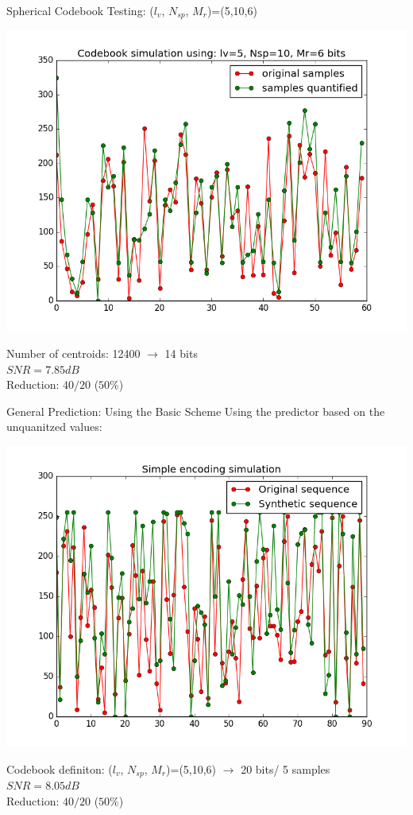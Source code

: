 \documentclass[10pt]{beamer}
\begin{document}
  \begin{frame}{Spherical Codebook Testing: ($l_v$, $N_{sp}$, $M_r$)=(5,10,6)}
    \begin{center}
    \includegraphics[width=0.8\linewidth]{./img/cb_5_10_6_r.png}\\
    \end{center}
    Number of centroids: 12400 $\rightarrow$ 14 bits\\
    $SNR = 7.85 dB$\\
    Reduction: $40/20$ ($50\%$)
  \end{frame}


  \begin{frame}{General Prediction: Using the Basic Scheme}
  Using the predictor based on the unquanitzed values:
    \begin{center}
    \includegraphics[width=0.7\linewidth]{./img/general_prediction_bo.png}\\
    \end{center}
    Codebook definiton: ($l_v$, $N_{sp}$, $M_r$)=(5,10,6) $\rightarrow$ 20 bits/ 5 samples\\
    $SNR = 8.05 dB$\\
    Reduction: $40/20$ ($50\%$)
  \end{frame}
\end{document}
